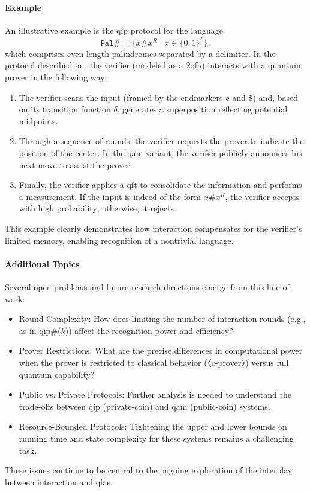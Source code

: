 \paragraph{Example}
An illustrative example is the \gls{qip} protocol for the language
\[
\mathtt{Pal\#} = \{x\#x^R \mid x\in\{0,1\}^*\},
\]
which comprises even-length palindromes separated by a delimiter. In the protocol described in \cite{nishimura2015interactive}, the verifier (modeled as a 2qfa) interacts with a quantum prover in the following way:
\begin{enumerate}
  \item The verifier scans the input (framed by the endmarkers $\cent$ and $\$$) and, based on its transition function $\delta$, generates a superposition reflecting potential midpoints.
  \item Through a sequence of rounds, the verifier requests the prover to indicate the position of the center. In the \gls{qam} variant, the verifier publicly announces his next move to assist the prover.
  \item Finally, the verifier applies a \gls{qft} to consolidate the information and performs a measurement. If the input is indeed of the form $x\#x^R$, the verifier accepts with high probability; otherwise, it rejects.
\end{enumerate}
This example clearly demonstrates how interaction compensates for the verifier's limited memory, enabling recognition of a nontrivial language.

\paragraph{Additional Topics}
Several open problems and future research directions emerge from this line of work:
\begin{itemize}
  \item Round Complexity: How does limiting the number of interaction rounds (e.g., as in \gls{qip}\#($k$)) affect the recognition power and efficiency?
  \item Prover Restrictions: What are the precise differences in computational power when the prover is restricted to classical behavior (〈c-prover〉) versus full quantum capability?
  \item Public vs. Private Protocols: Further analysis is needed to understand the trade-offs between \gls{qip} (private-coin) and \gls{qam} (public-coin) systems.
  \item Resource-Bounded Protocols: Tightening the upper and lower bounds on running time and state complexity for these systems remains a challenging task.
\end{itemize}
These issues continue to be central to the ongoing exploration of the interplay between interaction and \glspl{qfa}.

